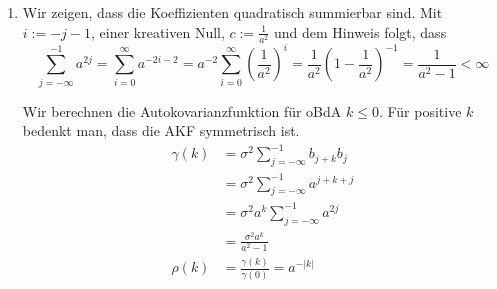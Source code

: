 \documentclass[a4paper,11pt,notitlepage,fullpage]{article}
\begin{document}
\begin{enumerate}
\newpage
\item Wir zeigen, dass die Koeffizienten quadratisch summierbar sind. Mit $i := -j-1$, einer kreativen Null, $c := \frac{1}{a^2}$ und dem Hinweis folgt, dass $$\sum_{j=-\infty}^{-1} a^{2j} = \sum_{i=0}^{\infty} a^{-2i-2} = a^{-2} \sum_{i = 0}^\infty (\frac{1}{a^2})^i = \frac{1}{a^2}(1-\frac{1}{a^2})^{-1} = \frac{1}{a^2-1} < \infty$$



Wir berechnen die Autokovarianzfunktion für oBdA $k \leq 0$. Für positive $k$ bedenkt man, dass die AKF symmetrisch ist. 
\begin{align*}
\gamma(k) &= \sigma^2 \sum_{j=-\infty}^{-1} b_{j+k}b_j \\
&= \sigma^2 \sum_{j=-\infty}^{-1} a^{j+k+j} \\
&= \sigma^2 a^k \sum_{j=-\infty}^{-1} a^{2j} \\
&= \frac{\sigma^2 a^k }{a^2-1} \\
\rho(k) &= \frac{\gamma(k)}{\gamma(0)} = a^{-|k|}
\end{align*}


\end{enumerate}
\end{document}
